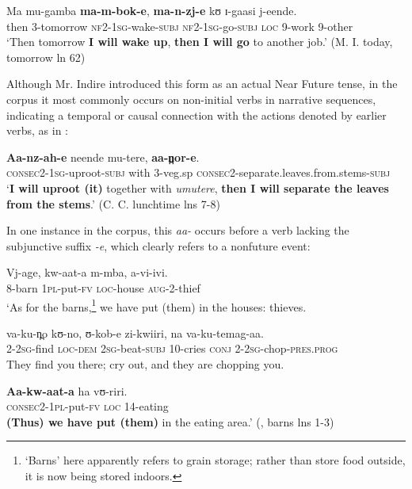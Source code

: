 \documentclass[output=paper]{langsci/langscibook}
\begin{document}
\ea\label{ex:sarvasy:28}
\gll Ma   mu-gamba   \textbf{ma-m-bok-e},     \textbf{ma-n-zj-e}     kʊ   ɪ{}-gaasi   j-eende. \\
then   3-tomorrow   \textsc{nf2}{}-\textsc{1sg}{}-wake-\textsc{subj}  \textsc{nf2}{}-\textsc{1sg}{}-go-\textsc{subj}  \textsc{loc}  9-work  9-other \\
\glt ‘Then tomorrow \textbf{I will wake up}, \textbf{then I will go} to another job.’ (M. I. today, tomorrow ln 62)
\z

Although Mr. Indire introduced this form as an actual Near Future tense, in the corpus it most commonly occurs on non-initial verbs in narrative sequences, indicating a temporal or causal connection with the actions denoted by earlier verbs, as in : 

\ea\label{ex:sarvasy:29}
\gll \textbf{Aa-nz-ah-e}       neende   mu-tere,  \textbf{aa-n̪or-e}.\\
\textsc{consec2}{}-\textsc{1sg}{}-uproot-\textsc{subj}  with  3-veg.sp  \textsc{consec2}{}-separate.leaves.from.stems-\textsc{subj} \\
\glt ‘\textbf{I will uproot (it)} together with \textit{umutere}, \textbf{then I will separate the leaves from the stems}.’ (C. C. lunchtime lns 7-8)
\z

In one instance in the corpus, this\textit{ aa-} occurs before a verb lacking the subjunctive suffix \textit{{}-e}, which clearly refers to a nonfuture event:

\ea\label{ex:sarvasy:30}
\gll Vj-age,     kw-aat-a   m-mba,   a-vi-ivi.\\
8-barn    \textsc{1pl}{}-put-\textsc{fv}  \textsc{loc}{}-house  \textsc{aug}{}-2-thief \\
\glt ‘As for the barns,\footnote{ ‘Barns’ here apparently refers to grain storage; rather than store food outside, it is now being stored indoors.} we have put (them) in the houses: thieves.

\gll va-ku-n̪o   kʊ{}-no,   ʊ{}-kob-e     zi-kwiiri,   na   va-ku-temag-aa. \\
2-\textsc{2sg}{}-find  \textsc{loc}{}-\textsc{dem}  \textsc{2sg}{}-beat-\textsc{subj}  10-cries  \textsc{conj}  2-\textsc{2sg}{}-chop-\textsc{pres}.\textsc{prog} \\
\glt They find you there; cry out, and they are chopping you. 

\gll \textbf{Aa-kw-aat-a}     ha   vʊ-riri. \\
\textsc{consec2}{}-\textsc{1pl}{}-put-\textsc{fv}  \textsc{loc}  14-eating \\
\glt \textbf{(Thus) we have put (them)} in the eating area.’ (\citealt{NicholsSsennyonga1976}, barns lns 1-3)
\z
\end{document}
